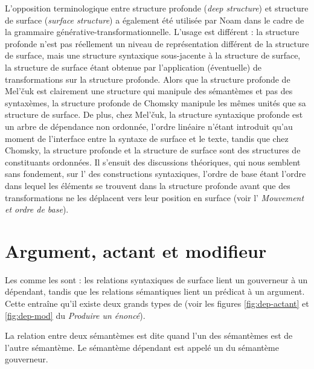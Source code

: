 {L’opposition terminologique entre structure profonde (\textit{deep structure}) et structure de surface (\textit{surface structure}) a également été utilisée par Noam  \citet{chomsky1965aspects} dans le cadre de la grammaire générative-transformationnelle. L’usage est différent : la structure profonde n’est pas réellement un niveau de représentation différent de la structure de surface, mais une structure syntaxique sous-jacente à la structure de surface, la structure de surface étant obtenue par l’application (éventuelle) de transformations sur la structure profonde. Alors que la structure profonde de Mel’čuk est clairement une structure qui manipule des sémantèmes et pas des syntaxèmes, la structure profonde de Chomsky manipule les mêmes unités que sa structure de surface. De plus, chez Mel’čuk, la structure syntaxique profonde est un arbre de dépendance non ordonnée, l’ordre linéaire n’étant introduit qu’au moment de l’interface entre la syntaxe de surface et le texte, tandis que chez Chomsky, la structure profonde et la structure de surface sont des structures de constituants ordonnées. Il s’ensuit des discussions théoriques, qui nous semblent sans fondement, sur l’ des constructions syntaxiques, l’ordre de base étant l’ordre dans lequel les éléments se trouvent dans la structure profonde avant que des transformations ne les déplacent vers leur position en surface (voir l’ \textit{Mouvement et ordre de base}).}

\section{Argument, actant et modifieur}\label{sec:13-actant}
Les  comme les  sont  : les relations syntaxiques de surface lient un gouverneur à un dépendant, tandis que les relations sémantiques lient un prédicat à un argument. Cette  entraîne qu’il existe deux grands types de  (voir les figures \ref{fig:dep-actant} et \ref{fig:dep-mod} du  \textit{Produire un énoncé}).

{La relation entre deux sémantèmes est dite  quand l’un des sémantèmes est  de l’autre sémantème. Le sémantème dépendant est appelé un  du sémantème gouverneur.}


